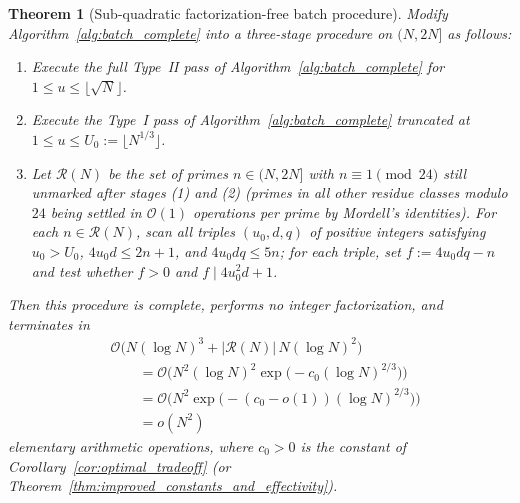 \documentclass[11pt, a4paper]{article}
\theoremstyle{plain}
\newtheorem{theorem}{Theorem}[section]
\theoremstyle{definition}
\begin{document}
\begin{theorem}[Sub-quadratic factorization-free batch procedure]\label{thm:subquadratic_batch}
Modify Algorithm~\ref{alg:batch_complete} into a three-stage procedure on $(N,2N]$ as follows:
\begin{enumerate}[(1)]
    \item Execute the full Type~II pass of Algorithm~\ref{alg:batch_complete} for $1\le u\le\lfloor\sqrt{N}\rfloor$.
    \item Execute the Type~I pass of Algorithm~\ref{alg:batch_complete} truncated at $1\le u\le U_0:=\lfloor N^{1/3}\rfloor$.
    \item Let $\mathcal{R}(N)$ be the set of primes $n\in(N,2N]$ with $n\equiv1\pmod{24}$ still unmarked after stages (1) and (2) (primes in all other residue classes modulo $24$ being settled in $\mathcal{O}(1)$ operations per prime by Mordell's identities). For each $n\in\mathcal{R}(N)$, scan all triples $(u_0,d,q)$ of positive integers satisfying $u_0>U_0$, $4u_0 d\le 2n+1$, and $4u_0 d q\le 5n$; for each triple, set $f:=4u_0 d q-n$ and test whether $f>0$ and $f\mid 4u_0^{2}d+1$.
\end{enumerate}
Then this procedure is complete, performs no integer factorization, and terminates in
\[
\begin{aligned}
&\mathcal{O}\Big(
    N(\log N)^3
    + |\mathcal{R}(N)|\,N(\log N)^2
  \Big) \\
&\qquad =
  \mathcal{O}\Big(
    N^2(\log N)^2
    \exp\big(-c_0(\log N)^{2/3}\big)
  \Big) \\
&\qquad =
  \mathcal{O}\Big(
    N^2\exp\big(-(c_0-o(1))(\log N)^{2/3}\big)
  \Big) \\
&\qquad = o(N^2)
\end{aligned}
\]
elementary arithmetic operations, where $c_0>0$ is the constant of Corollary~\ref{cor:optimal_tradeoff} (or Theorem~\ref{thm:improved_constants_and_effectivity}).
\end{theorem}
\end{document}
